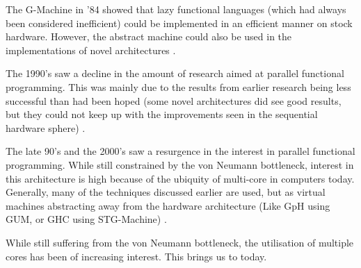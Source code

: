     The G-Machine in '84 showed that lazy functional languages (which had always
been considered inefficient) could be implemented in an efficient manner on
stock hardware. However, the abstract machine could also be used in the
implementations of novel architectures \citep{Augustsson:LazyMLCompiler}.

    The 1990's saw a decline in the amount of research aimed at parallel
functional programming. This was mainly due to the results from earlier research
being less successful than had been hoped (some novel architectures did see good
results, but they could not keep up with the improvements seen in the sequential
hardware sphere) \citep{PFPAnIntro, clackbook}.

    The late 90's and the 2000's saw a resurgence in the interest in parallel
functional programming. While still constrained by the von Neumann bottleneck,
interest in this architecture is high because of the ubiquity of multi-core in
computers today. Generally, many of the techniques discussed earlier are used, but as virtual
machines abstracting away from the hardware architecture (Like GpH using GUM, or
GHC using STG-Machine) \citep{buckwheat, haskellSharedMem}.


While still suffering from the von Neumann bottleneck, the
utilisation of multiple cores has been of increasing interest. This brings us to
today.
